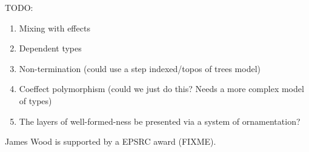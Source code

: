 \documentclass[sigplan,review]{acmart}\settopmatter{printfolios=true,printccs=false,printacmref=false}
\begin{document}
TODO:
\begin{enumerate}
\item Mixing with effects
\item Dependent types
\item Non-termination (could use a step indexed/topos of trees model)
\item Coeffect polymorphism (could we just do this? Needs a more
  complex model of types)
\item The layers of well-formed-ness be presented via a system of
  ornamentation?
\end{enumerate}

\begin{acks}                            %
  James Wood is supported by a EPSRC award (FIXME).
\end{acks}


%



\end{document}
